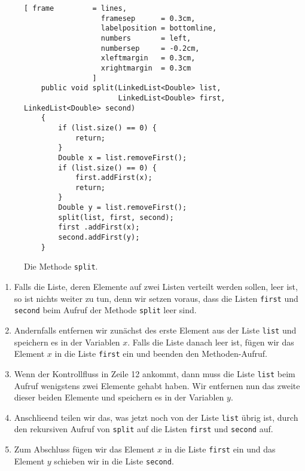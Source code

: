 \begin{figure}[!ht]
  \centering
\begin{Verbatim}[ frame         = lines, 
                  framesep      = 0.3cm, 
                  labelposition = bottomline,
                  numbers       = left,
                  numbersep     = -0.2cm,
                  xleftmargin   = 0.3cm,
                  xrightmargin  = 0.3cm
                ]
    public void split(LinkedList<Double> list, 
                      LinkedList<Double> first, LinkedList<Double> second) 
    {
        if (list.size() == 0) {
            return;
        }
        Double x = list.removeFirst();
        if (list.size() == 0) {
            first.addFirst(x);
            return;
        }
        Double y = list.removeFirst();
        split(list, first, second);
        first .addFirst(x);
        second.addFirst(y);
    }
\end{Verbatim}
\vspace*{-0.3cm}
  \caption{Die Methode \texttt{split}.}
  \label{fig:split}
\end{figure}
\begin{enumerate}
\item Falls die Liste, deren Elemente auf zwei Listen verteilt werden sollen, leer ist,
      so ist nichts weiter zu tun, denn wir setzen voraus, dass die Listen \texttt{first}
      und \texttt{second} beim Aufruf der Methode \texttt{split} leer sind.
\item Andernfalls entfernen wir zun\"achst des erste Element aus der Liste \texttt{list} und
      speichern es in der Variablen $x$.
      Falls die Liste danach leer ist, f\"ugen wir das Element $x$
      in die Liste \texttt{first} ein und beenden den Methoden-Aufruf.
\item Wenn der Kontrollfluss in Zeile 12 ankommt, dann muss die Liste \texttt{list} beim Aufruf
      wenigstens zwei Elemente gehabt haben.  Wir entfernen nun das zweite dieser beiden
      Elemente und speichern es in der Variablen $y$.
\item Anschlie\3end teilen wir das, was jetzt noch von der Liste \texttt{list} \"ubrig ist,
      durch den rekursiven Aufruf von \texttt{split} auf die Listen \texttt{first} und
      \texttt{second} auf.
\item Zum Abschluss f\"ugen wir das Element $x$ in die Liste \texttt{first} ein
      und das Element $y$ schieben wir in die Liste \texttt{second}.
\end{enumerate}


